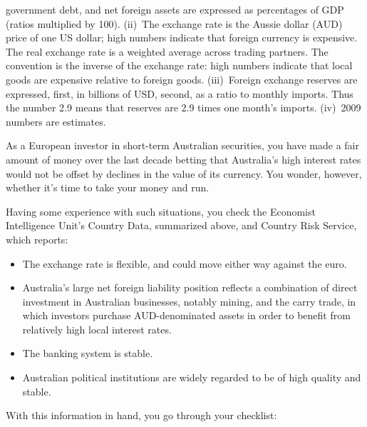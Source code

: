 \documentclass[letterpaper,12pt]{exam}
\begin{document}
\begin{questions}
{government debt, and net foreign assets
are expressed as percentages of GDP (ratios multiplied by 100).
(ii)~The exchange rate is the Aussie dollar (AUD) price
of one US dollar;
high numbers indicate that foreign currency is expensive.
The real exchange rate is a weighted average across trading partners.
The convention is the inverse of the exchange rate:
high numbers indicate that local goods are expensive relative to foreign
goods.
(iii)~Foreign exchange reserves are expressed, first,
in billions of USD, second,
as a ratio to monthly imports.
Thus the number 2.9 means that reserves are 2.9 times one
month's imports.
(iv)~2009 numbers are estimates.}

As a European investor in short-term Australian securities,
you have made a fair amount of money over the last decade
betting that Australia's high interest rates would not
be offset by declines in the value of its currency.
You wonder, however, whether it's time to take your money
and run.

Having some experience with such situations,
you check the Economist Intelligence Unit's Country Data,
summarized above,
and Country Risk Service,
which reports:
%
\begin{itemize}
\item The exchange rate is flexible, and could move either way against
the euro.
\item Australia's large net foreign liability position reflects
a combination of direct investment in Australian businesses,
notably mining,
and the carry trade,
in which investors purchase AUD-denominated assets
in order to benefit from relatively high local interest rates.
\item The banking system is stable.
\item Australian political institutions are widely regarded to be 
of high quality and stable.  
\end{itemize}

With this information in hand, you go through your checklist:
%
\end{questions}
\end{document}
